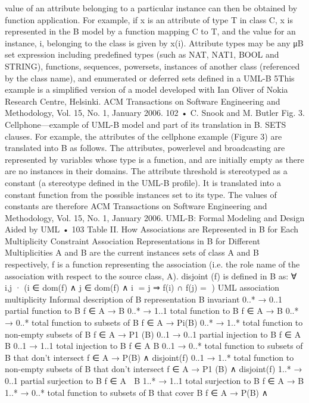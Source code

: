 value of an attribute belonging to a particular instance can then be obtained
by function application. For example, if x is an attribute of type T in class C,
x is represented in the B model by a function mapping C to T, and the value
for an instance, i, belonging to the class is given by x(i). Attribute types may be
any μB set expression including predefined types (such as NAT, NAT1, BOOL
and STRING), functions, sequences, powersets, instances of another class (referenced by the class name), and enumerated or deferred sets defined in a UML-B
5This example is a simplified version of a model developed with Ian Oliver of Nokia Research
Centre, Helsinki.
ACM Transactions on Software Engineering and Methodology, Vol. 15, No. 1, January 2006.
102 • C. Snook and M. Butler
Fig. 3. Cellphone—example of UML-B model and part of its translation in B.
SETS clauses. For example, the attributes of the cellphone example (Figure 3)
are translated into B as follows.
The attributes, powerlevel and broadcasting are represented by variables
whose type is a function, and are initially empty as there are no instances
in their domains. The attribute threshold is stereotyped as a constant (a stereotype defined in the UML-B profile). It is translated into a constant function
from the possible instances set to its type. The values of constants are therefore
ACM Transactions on Software Engineering and Methodology, Vol. 15, No. 1, January 2006.
UML-B: Formal Modeling and Design Aided by UML • 103
Table II. How Associations are Represented in B for Each Multiplicity Constraint
Association Representations in B for Different Multiplicities
A and B are the current instances sets of class A and B respectively, f is a function representing
the association (i.e. the role name of the association with respect to the source class, A). disjoint
(f) is defined in B as: ∀ i,j · (i ∈ dom(f) ∧ j ∈ dom(f) ∧ i = j ⇒ f(i) ∩ f(j) = )
UML association
multiplicity Informal description of B representation B invariant
0..* → 0..1 partial function to B f ∈ A → B
0..* → 1..1 total function to B f ∈ A → B
0..* → 0..* total function to subsets of B f ∈ A → Pi(B)
0..* → 1..* total function to non-empty subsets of B f ∈ A → P1 (B)
0..1 → 0..1 partial injection to B f ∈ A  B
0..1 → 1..1 total injection to B f ∈ A  B
0..1 → 0..* total function to subsets of B that don’t
intersect
f ∈ A → P(B) ∧
disjoint(f)
0..1 → 1..* total function to non-empty subsets of B
that don’t intersect
f ∈ A → P1 (B) ∧
disjoint(f)
1..* → 0..1 partial surjection to B f ∈ A  B
1..* → 1..1 total surjection to B f ∈ A → B
1..* → 0..* total function to subsets of B that cover B f ∈ A → P(B) ∧
